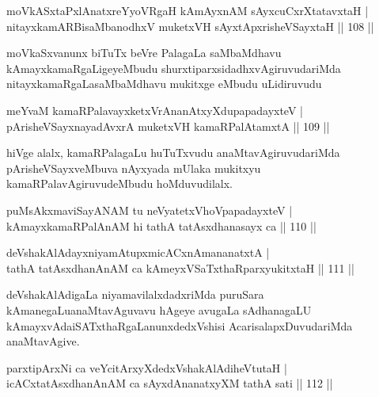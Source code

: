 \begin{shl}
moVkASxtaPxlAnatxreYyoVRgaH kAmAyxnAM sAyxcuCxrXtatavxtaH |\\
nitayxkamARBisaMbanodhxV muketxVH sAyxtApxrisheVSayxtaH \hfill || 108 ||
\end{shl}

\begin{artha}
moVkaSxvanunx biTuTx beVre PalagaLa saMbaMdhavu kAmayxkamaRgaLigeyeMbudu shurxtiparxsidadhxvAgiruvudariMda nitayxkamaRgaLasaMbaMdhavu mukitxge eMbudu uLidiruvudu
\end{artha}


\begin{shl}
meYvaM kamaRPalavayxketxVrAnanAtxyXdupapadayxteV |\\
pArisheVSayxnayadAvxrA muketxVH kamaRPalAtamxtA \hfill || 109 ||
\end{shl}

\begin{artha}
hiVge alalx, kamaRPalagaLu huTuTxvudu anaMtavAgiruvudariMda pArisheVSayxveMbuva nAyxyada mUlaka mukitxyu kamaRPalavAgiruvudeMbudu hoMduvudilalx.
\end{artha}


\begin{shl}
puMsAkxmaviSayANAM tu neVyatetxVhoVpapadayxteV |\\
kAmayxkamaRPalAnAM hi tathA tatAsxdhanasayx ca \hfill || 110 ||
\end{shl}

\begin{shl}
deVshakAlAdayxniyamAtupxmicACxnAmananatxtA |\\
tathA tatAsxdhanAnAM ca kAmeyxVSaTxthaRparxyukitxtaH \hfill || 111 ||
\end{shl}

\begin{artha}
deVshakAlAdigaLa niyamavilalxdadxriMda puruSara kAmanegaLu\break anaMtavAguvavu hAgeye avugaLa sAdhanagaLU kAmayxvAda\break iSATxthaRgaLanunxdedxVshisi AcarisalapxDuvudariMda anaMtavAgive.
\end{artha}


\begin{shl}
parxtipArxNi ca veYcitArxyXdedxVshakAlAdiheVtutaH |\\
icACxtatAsxdhanAnAM ca sAyxdAnanatxyXM tathA sati \hfill || 112 ||
\end{shl}

